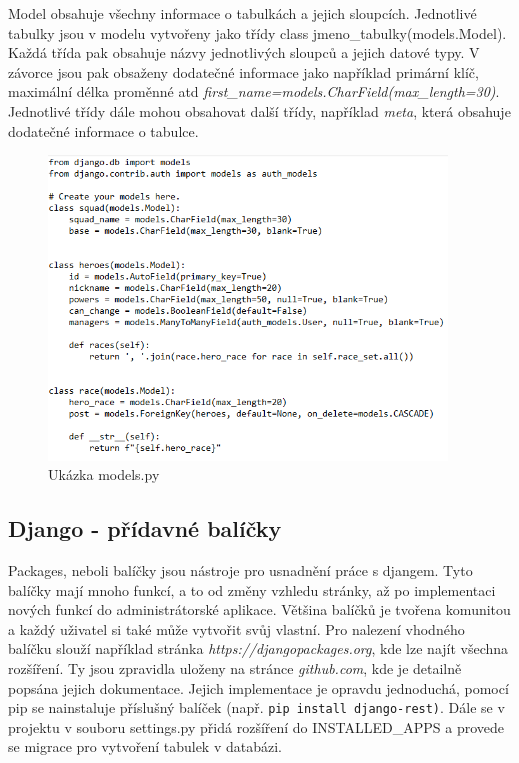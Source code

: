 Model obsahuje všechny informace o tabulkách a jejich
sloupcích. Jednotlivé tabulky jsou v modelu vytvořeny jako třídy class
jmeno\_tabulky(models.Model). Každá třída pak obsahuje názvy
jednotlivých sloupců a jejich datové typy. V závorce jsou pak obsaženy
dodatečné informace jako například primární klíč, maximální délka
proměnné atd
\textit{first\_name=models.CharField(max\_length=30)}. Jednotlivé
třídy dále mohou obsahovat další třídy, například \textit{meta}, která obsahuje
dodatečné informace o tabulce.

\vspace{15px}

\begin{figure}[H] \centering
  \includegraphics[width=300pt]{./pictures/2-model-example.png}
    \caption[Model příklad]{Ukázka models.py}
	\label{fig:Ukázka models.py}                                
\end{figure}

\newpage

\subsection{Django - přídavné balíčky}

Packages, neboli balíčky jsou nástroje pro usnadnění práce s
djangem. Tyto balíčky mají mnoho funkcí, a to od změny vzhledu
stránky, až po implementaci nových funkcí do administrátorské aplikace. Většina
balíčků je tvořena komunitou a každý uživatel si také může vytvořit
svůj vlastní. Pro nalezení vhodného balíčku slouží například stránka
\textit{https://djangopackages.org}, kde lze najít všechna
rozšíření. Ty jsou zpravidla uloženy na stránce \textit{github.com}, kde
je detailně popsána jejich dokumentace. Jejich implementace je opravdu
jednoduchá, pomocí pip se nainstaluje příslušný balíček (např. {\tt pip
install django-rest)}. Dále se v projektu v souboru settings.py přidá
rozšíření do INSTALLED\_APPS a provede se migrace pro
vytvo\-ření tabulek v databázi. \cite{django-packages}

